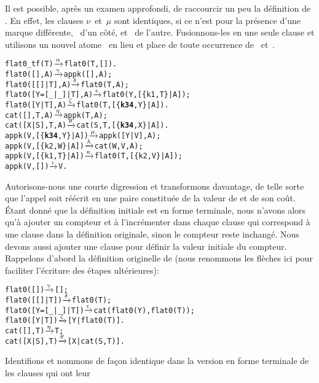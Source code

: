 Il est possible, après un examen approfondi, de raccourcir un peu la
définition de . En effet, les clauses
\(\nu\)~et~\(\mu\) sont identiques, si ce n'est pour la présence d'une
marque différente, ~d'un côté, et ~de l'autre.
Fusionnons-les en une seule clause et utilisons un nouvel
atome~ en lieu et place de toute occurrence de ~et~.\label{code_flat0_tf}
\begin{alltt}
flat0\_tf(T)          \(\smashedrightarrow{\alpha}\) flat0(T,[]).
flat0(         [],A) \(\smashedrightarrow{\gamma}\) appk([],A);
flat0(     [[]|T],A) \(\smashedrightarrow{\delta}\) flat0(T,A);
flat0([Y=[\_|\_]|T],A) \(\smashedrightarrow{\epsilon}\) flat0(Y,[\{k1,T\}|A]);
flat0(      [Y|T],A) \(\smashedrightarrow{\zeta}\) flat0(T,[\{\textbf{k34},Y\}|A]).
cat(   [],T,A)       \(\smashedrightarrow{\eta}\) appk(T,A);
cat([X|S],T,A)       \(\smashedrightarrow{\theta}\) cat(S,T,[\{\textbf{k34},X\}|A]).
appk(V,[\{\textbf{k34},Y\}|A])  \(\smashedrightarrow{\mu}\) appk([Y|V],A);
appk(V, [\{k2,W\}|A])  \(\smashedrightarrow{\lambda}\) cat(W,V,A);
appk(V, [\{k1,T\}|A])  \(\smashedrightarrow{\kappa}\) flat0(T,[\{k2,V\}|A]);
appk(V,         [])  \(\smashedrightarrow{\iota}\) V.
\end{alltt}
Autorisons-nous une courte digression et transformons
 davantage, de telle sorte que l'appel
 soit réécrit en une paire constituée de la
valeur de  et de son coût. Étant donné que la
définition initiale est en forme terminale, nous n'avons alors qu'à
ajouter un compteur et à l'incrémenter dans chaque clause qui
correspond à une clause dans la définition originale, sinon le
compteur reste inchangé. Nous devons aussi ajouter une clause pour
définir la valeur initiale du compteur. Rappelons d'abord la
définition originelle de  (nous renommons les flèches
ici pour faciliter l'écriture des étapes ultérieures):
\begin{alltt}
flat0(         []) \(\smashedrightarrow{\gamma}\) [];
flat0(     [[]|T]) \(\smashedrightarrow{\delta}\) flat0(T);
flat0([Y=[\_|\_]|T]) \(\smashedrightarrow{\epsilon}\) cat(flat0(Y),flat0(T));
flat0(      [Y|T]) \(\smashedrightarrow{\zeta}\) [Y|flat0(T)].
cat(   [],T)       \(\smashedrightarrow{\eta}\) T;
cat([X|S],T)       \(\smashedrightarrow{\theta}\) [X|cat(S,T)].
\end{alltt}
Identifions et nommons de façon identique dans la version en forme
terminale de  les clauses qui ont leur
